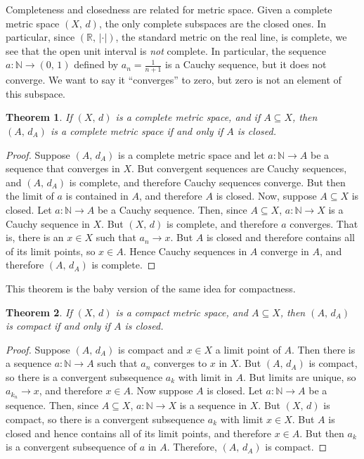 \documentclass{article}
\theoremstyle{plain}
\newtheorem{theorem}{Theorem}[section]
\theoremstyle{normal}
\begin{document}
        Completeness and closedness are related for metric space. Given a
        complete metric space $(X,\,d)$, the only complete subspaces are the
        closed ones. In particular, since $(\mathbb{R},\,|\cdot|)$, the standard
        metric on the real line, is complete, we see that the open unit interval
        is \textit{not} complete. In particular, the sequence
        $a:\mathbb{N}\rightarrow(0,\,1)$ defined by $a_{n}=\frac{1}{n+1}$
        is a Cauchy sequence, but it does not converge. We want to say it
        ``converges'' to zero, but zero is not an element of this subspace.
        \begin{theorem}
            If $(X,\,d)$ is a complete metric space, and if
            $A\subseteq{X}$, then $(A,\,d_{A})$ is a complete metric space if
            and only if $A$ is closed.
        \end{theorem}
        \begin{proof}
            Suppose $(A,\,d_{A})$ is a complete metric space and let
            $a:\mathbb{N}\rightarrow{A}$ be a sequence that converges in $X$.
            But convergent sequences are Cauchy sequences, and $(A,\,d_{A})$ is
            complete, and therefore Cauchy sequences converge. But then the
            limit of $a$ is contained in $A$, and therefore $A$ is closed.
            Now, suppose $A\subseteq{X}$ is closed. Let
            $a:\mathbb{N}\rightarrow{A}$ be a Cauchy sequence. Then, since
            $A\subseteq{X}$, $a:\mathbb{N}\rightarrow{X}$ is a Cauchy sequence
            in $X$. But $(X,\,d)$ is complete, and therefore $a$ converges.
            That is, there is an $x\in{X}$ such that $a_{n}\rightarrow{x}$.
            But $A$ is closed and therefore contains all of its limit points,
            so $x\in{A}$. Hence Cauchy sequences in $A$ converge in $A$, and
            therefore $(A,\,d_{A})$ is complete.
        \end{proof}
        This theorem is the baby version of the same idea for compactness.
        \begin{theorem}
            If $(X,\,d)$ is a compact metric space, and $A\subseteq{X}$, then
            $(A,\,d_{A})$ is compact if and only if $A$ is closed.
        \end{theorem}
        \begin{proof}
            Suppose $(A,\,d_{A})$ is compact and $x\in{X}$ a limit point of
            $A$. Then there is a sequence $a:\mathbb{N}\rightarrow{A}$ such
            that $a_{n}$ converges to $x$ in $X$. But $(A,\,d_{A})$ is compact,
            so there is a convergent subsequence $a_{k}$ with limit in $A$.
            But limits are unique, so $a_{k_{n}}\rightarrow{x}$, and therefore
            $x\in{A}$. Now suppose $A$ is closed. Let
            $a:\mathbb{N}\rightarrow{A}$ be a sequence. Then, since
            $A\subseteq{X}$, $a:\mathbb{N}\rightarrow{X}$ is a sequence in $X$.
            But $(X,\,d)$ is compact, so there is a convergent subsequence
            $a_{k}$ with limit $x\in{X}$. But $A$ is closed and hence contains
            all of its limit points, and therefore $x\in{A}$. But then
            $a_{k}$ is a convergent subsequence of $a$ in $A$. Therefore,
            $(A,\,d_{A})$ is compact.
        \end{proof}
\end{document}

